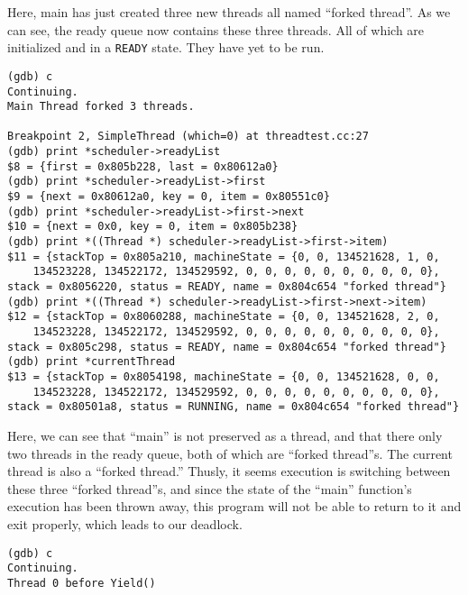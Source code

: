\documentclass[letterpaper, 10pt]{article}
\begin{document}
\begin{enumerate}
{	Here, main has just created three new threads all named ``forked thread''. As we can see, the ready queue now contains these three threads. All of which are initialized and in a {\tt READY} state. They have yet to be run.

	\begin{verbatim}
(gdb) c
Continuing.
Main Thread forked 3 threads.

Breakpoint 2, SimpleThread (which=0) at threadtest.cc:27
(gdb) print *scheduler->readyList
$8 = {first = 0x805b228, last = 0x80612a0}
(gdb) print *scheduler->readyList->first
$9 = {next = 0x80612a0, key = 0, item = 0x80551c0}
(gdb) print *scheduler->readyList->first->next
$10 = {next = 0x0, key = 0, item = 0x805b238}
(gdb) print *((Thread *) scheduler->readyList->first->item)
$11 = {stackTop = 0x805a210, machineState = {0, 0, 134521628, 1, 0,
	134523228, 134522172, 134529592, 0, 0, 0, 0, 0, 0, 0, 0, 0, 0},
stack = 0x8056220, status = READY, name = 0x804c654 "forked thread"}
(gdb) print *((Thread *) scheduler->readyList->first->next->item)
$12 = {stackTop = 0x8060288, machineState = {0, 0, 134521628, 2, 0,
	134523228, 134522172, 134529592, 0, 0, 0, 0, 0, 0, 0, 0, 0, 0},
stack = 0x805c298, status = READY, name = 0x804c654 "forked thread"}
(gdb) print *currentThread
$13 = {stackTop = 0x8054198, machineState = {0, 0, 134521628, 0, 0,
	134523228, 134522172, 134529592, 0, 0, 0, 0, 0, 0, 0, 0, 0, 0},
stack = 0x80501a8, status = RUNNING, name = 0x804c654 "forked thread"}
	\end{verbatim}

	Here, we can see that ``main'' is not preserved as a thread, and that there only two threads in the ready queue, both of which are ``forked thread''s. The current thread is also a ``forked thread.'' Thusly, it seems execution is switching between these three ``forked thread''s, and since the state of the ``main'' function's execution has been thrown away, this program will not be able to return to it and exit properly, which leads to our deadlock.

	\begin{verbatim}
(gdb) c
Continuing.
Thread 0 before Yield()


\end{verbatim}}
\end{enumerate}
\end{document}
